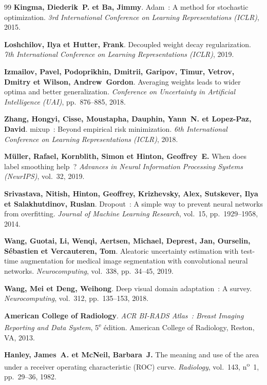 \begin{thebibliography}{99}
\textbf{Kingma, Diederik~P. et Ba, Jimmy}.
Adam~: A method for stochastic optimization.
\textit{3rd International Conference on Learning Representations (ICLR)},
2015.

\textbf{Loshchilov, Ilya et Hutter, Frank}.
Decoupled weight decay regularization.
\textit{7th International Conference on Learning Representations (ICLR)},
2019.

\textbf{Izmailov, Pavel, Podoprikhin, Dmitrii, Garipov, Timur,
Vetrov, Dmitry et Wilson, Andrew~Gordon}.
Averaging weights leads to wider optima and better generalization.
\textit{Conference on Uncertainty in Artificial Intelligence (UAI)},
pp.~876--885, 2018.

\textbf{Zhang, Hongyi, Cisse, Moustapha, Dauphin, Yann~N. et Lopez-Paz, David}.
mixup~: Beyond empirical risk minimization.
\textit{6th International Conference on Learning Representations (ICLR)},
2018.

\textbf{M\"uller, Rafael, Kornblith, Simon et Hinton, Geoffrey~E.}
When does label smoothing help~?
\textit{Advances in Neural Information Processing Systems (NeurIPS)},
vol.~32, 2019.

\textbf{Srivastava, Nitish, Hinton, Geoffrey, Krizhevsky, Alex,
Sutskever, Ilya et Salakhutdinov, Ruslan}.
Dropout~: A simple way to prevent neural networks from overfitting.
\textit{Journal of Machine Learning Research}, vol.~15, pp.~1929--1958,
2014.

\textbf{Wang, Guotai, Li, Wenqi, Aertsen, Michael, Deprest, Jan,
Ourselin, S\'ebastien et Vercauteren, Tom}.
Aleatoric uncertainty estimation with test-time augmentation for medical
image segmentation with convolutional neural networks.
\textit{Neurocomputing}, vol.~338, pp.~34--45, 2019.

\textbf{Wang, Mei et Deng, Weihong}.
Deep visual domain adaptation~: A survey.
\textit{Neurocomputing}, vol.~312, pp.~135--153, 2018.

\textbf{American College of Radiology}.
\textit{ACR BI-RADS\textregistered{} Atlas~: Breast Imaging Reporting and
Data System}, 5\textsuperscript{e} \'edition.
American College of Radiology, Reston, VA, 2013.

\textbf{Hanley, James~A. et McNeil, Barbara~J.}
The meaning and use of the area under a receiver operating characteristic
(ROC) curve.
\textit{Radiology}, vol.~143, n\textsuperscript{o}~1, pp.~29--36, 1982.


\end{thebibliography}
